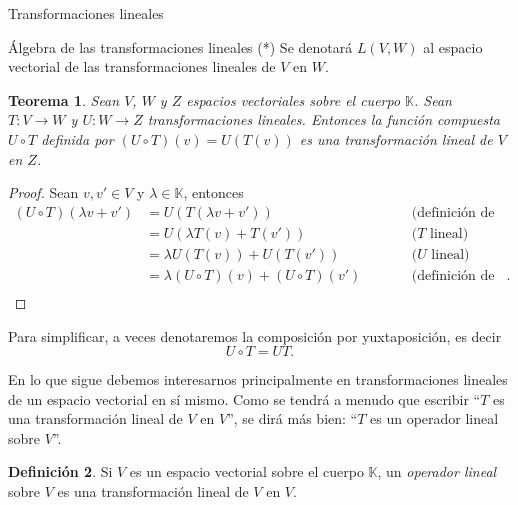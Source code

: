 \documentclass[a4paper,12pt,twoside,spanish,reqno]{amsbook}
\numberwithin{equation}{section}
\newtheorem{teorema}{Teorema}[section]
\theoremstyle{definition}
\newtheorem{definicion}[teorema]{Definici\'on}
\theoremstyle{remark}
\newcommand{\K}{\mathbb K}
\begin{document}
\begin{chapter}{Transformaciones lineales}
\begin{section}{Álgebra de las transformaciones lineales (*)}
        Se denotará  $L(V,W)$ al espacio vectorial de las transformaciones lineales de $V$ en $W$.
        
        \begin{teorema}\label{th-6-hoffman}
            Sean $V$, $W$ y $Z$ espacios vectoriales sobre el cuerpo $\K$.  Sean $T: V \to W$ y $U: W \to Z$ 
            transformaciones lineales. Entonces la función compuesta $U\circ T$ definida por $(U\circ T)(v) = U(T(v))$ es una transformación lineal de $V$ en $Z$.
        \end{teorema} 
        \begin{proof} Sean $v, v' \in V$ y $\lambda \in \K$, entonces
            \begin{equation*}
            \begin{array}{rlll}
                (U\circ T)(\lambda v + v') &= U(T(\lambda v + v'))&\qquad&\text{(definición de composición)} \\
                 &= U(\lambda T( v) + T(v'))&\qquad&\text{($T$ lineal)} \\
                 &= \lambda U(T( v)) + U(T(v'))&\qquad&\text{($U$ lineal)} \\
                 &= \lambda (U\circ T)( v) + (U\circ T)(v')&\qquad&\text{(definición de composición)}. \\
            \end{array}
            \end{equation*}
            
        \end{proof}
        
        Para simplificar, a veces  denotaremos la composición por yuxtaposición,  es decir $$U\circ T = U T.$$
        
        
        En lo que sigue debemos interesarnos principalmente en transformaciones lineales de un espacio vectorial en sí mismo. Como se tendrá a menudo que 	escribir ``$T$ es una transformación lineal de $V$ en $V$'', se dirá más bien: ``$T$ es un operador lineal sobre $V$''. 
        
        \begin{definicion}
            Si $V$ es un espacio vectorial sobre el cuerpo $\K$, un \textit{operador lineal} sobre $V$ es una transformación lineal de $V$ en $V$.
        \end{definicion}
        

\end{section}
\end{chapter}
\end{document}
